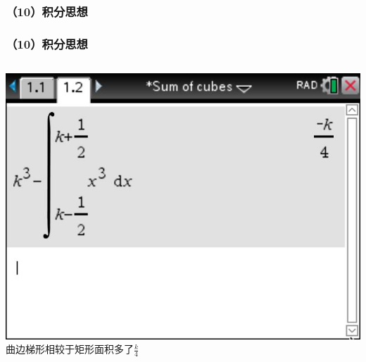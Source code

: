 \documentclass[aspectratio=169]{beamer}
\begin{document}
\subsubsection{（10）积分思想}
       \begin{frame}
       \frametitle{（10）积分思想}
       \begin{columns}
       	\includegraphics[scale=0.22]{积分运算1.jpg}\\
       	\scriptsize{曲边梯形相较于矩形面积\color{red}多了$ \frac{k}{4} $}\\
       	\hspace{1cm}
       	

\end{columns}
\end{frame}
\end{document}
